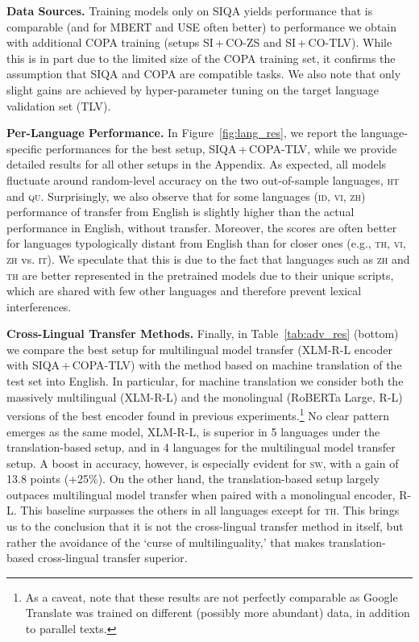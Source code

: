\documentclass[11pt,a4paper]{article}
\begin{document}
\vspace{1.4mm}
\noindent \textbf{Data Sources.} 
Training models only on SIQA yields performance that is comparable (and for MBERT and USE often better) to performance we obtain with additional COPA training (setups SI\,+\,CO-ZS and SI\,+\,CO-TLV). While this is in part due to the limited size of the COPA training set, it confirms the assumption that SIQA and COPA are compatible tasks. We also note that only slight gains are achieved by hyper-parameter tuning on the target language validation set (TLV).  
 




\vspace{1.4mm}
\noindent \textbf{Per-Language Performance.}
In Figure~\ref{fig:lang_res}, we report the language-specific performances for the best setup, SIQA\,+\,COPA-TLV, while we provide detailed results for all other setups in the Appendix. As expected, all models fluctuate around random-level accuracy on the two out-of-sample languages, \textsc{ht} and \textsc{qu}.
Surprisingly, we also observe that for some languages (\textsc{id}, \textsc{vi}, \textsc{zh}) performance of transfer from English is slightly higher than the actual performance in English, without transfer. Moreover, the scores are often better for languages typologically distant from English than for closer ones (e.g., \textsc{th}, \textsc{vi}, \textsc{zh} vs. \textsc{it}). We speculate that this is due to the fact that languages such as \textsc{zh} and \textsc{th} are better represented in the pretrained models due to their unique scripts, which are shared with few other languages and therefore prevent lexical interferences.

\vspace{1.4mm}
\noindent \textbf{Cross-Lingual Transfer Methods.} Finally, in Table~\ref{tab:adv_res} (bottom) we compare the best setup for multilingual model transfer (XLM-R-L encoder with SIQA\,+\,COPA-TLV) with the method based on machine translation of the test set into English. In particular, for machine translation we consider both the massively multilingual (XLM-R-L) and the monolingual (RoBERTa Large, R-L) versions of the best encoder found in previous experiments.\footnote{As a caveat, note that these results are not perfectly comparable as Google Translate was trained on different (possibly more abundant) data, in addition to parallel texts.} No clear pattern emerges as the same model, XLM-R-L, is superior in 5 languages under the translation-based setup, and in 4 languages for the multilingual model transfer setup. A boost in accuracy, however, is especially evident for \textsc{sw}, with a gain of 13.8 points (+25\%). On the other hand, the translation-based setup largely outpaces multilingual model transfer when paired with a monolingual encoder, R-L. This baseline surpasses the others in all languages except for \textsc{th}. This brings us to the conclusion that it is not the cross-lingual transfer method in itself, but rather the avoidance of the `curse of multilinguality,' that makes translation-based cross-lingual transfer superior.
\end{document}
